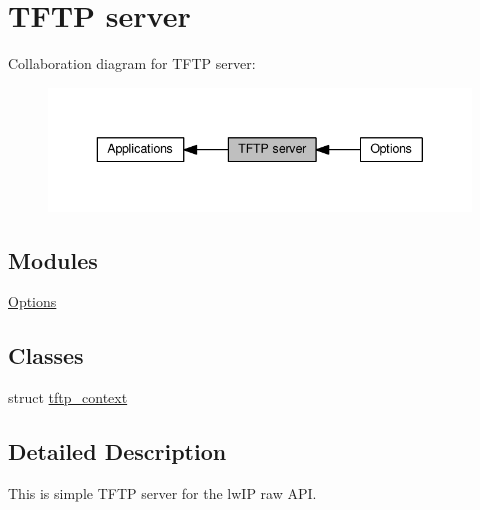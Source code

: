 \hypertarget{group__tftp}{}\section{T\+F\+TP server}
\label{group__tftp}
Collaboration diagram for T\+F\+TP server\+:
\nopagebreak
\begin{figure}[H]
\begin{center}
\leavevmode
\includegraphics[width=343pt]{group__tftp}
\end{center}
\end{figure}
\subsection*{Modules}
\begin{DoxyCompactItemize}
\item 
\hyperlink{group__tftp__opts}{Options}
\end{DoxyCompactItemize}
\subsection*{Classes}
\begin{DoxyCompactItemize}
\item 
struct \hyperlink{structtftp__context}{tftp\+\_\+context}
\end{DoxyCompactItemize}


\subsection{Detailed Description}
This is simple T\+F\+TP server for the lw\+IP raw A\+PI. 